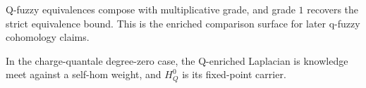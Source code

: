 \begin{theorem}\label{thm:q-fuzzy-equivalence-composes}\leanok{}
Q-fuzzy equivalences compose with multiplicative grade, and grade \(1\)
recovers the strict equivalence bound.  This is the enriched comparison
surface for later q-fuzzy cohomology claims.
\end{theorem}

\begin{theorem}\label{thm:h0-q-laplacian-fixed-points}\leanok{}
In the charge-quantale degree-zero case, the Q-enriched Laplacian is knowledge
meet against a self-hom weight, and \(H^0_Q\) is its fixed-point carrier.
\end{theorem}
